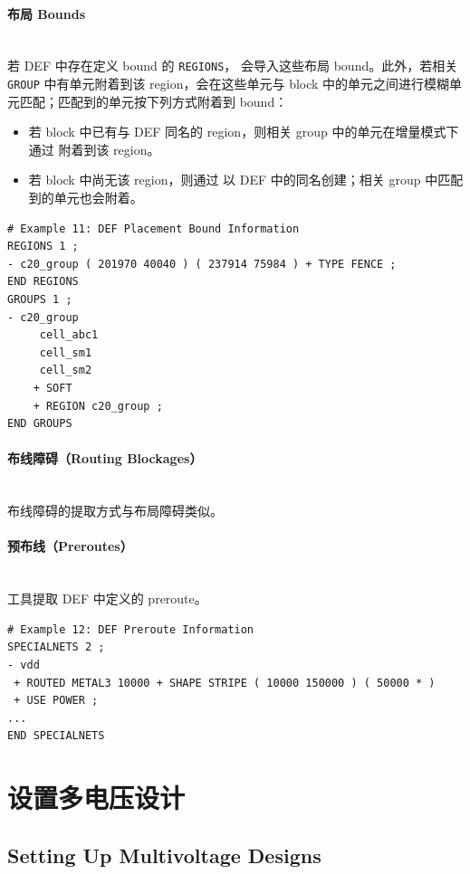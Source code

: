 \paragraph{布局 Bounds}\mbox{}\\
若 DEF 中存在定义 bound 的 \texttt{REGIONS}， 会导入这些布局 bound。此外，若相关 \texttt{GROUP} 中有单元附着到该 region，会在这些单元与 block 中的单元之间进行模糊单元匹配；匹配到的单元按下列方式附着到 bound：
\begin{itemize}
  \item 若 block 中已有与 DEF 同名的 region，则相关 group 中的单元在增量模式下通过  附着到该 region。
  \item 若 block 中尚无该 region，则通过  以 DEF 中的同名创建；相关 group 中匹配到的单元也会附着。
\end{itemize}

\begin{lstlisting}
# Example 11: DEF Placement Bound Information
REGIONS 1 ;
- c20_group ( 201970 40040 ) ( 237914 75984 ) + TYPE FENCE ;
END REGIONS
GROUPS 1 ;
- c20_group
     cell_abc1
     cell_sm1
     cell_sm2
    + SOFT
    + REGION c20_group ;
END GROUPS
\end{lstlisting}

\paragraph{布线障碍（Routing Blockages）}\mbox{}\\
布线障碍的提取方式与布局障碍类似。

\paragraph{预布线（Preroutes）}\mbox{}\\
工具提取 DEF 中定义的 preroute。

\begin{lstlisting}
# Example 12: DEF Preroute Information
SPECIALNETS 2 ;
- vdd
 + ROUTED METAL3 10000 + SHAPE STRIPE ( 10000 150000 ) ( 50000 * )
 + USE POWER ;
...
END SPECIALNETS
\end{lstlisting}

\section{设置多电压设计}
\subsection*{Setting Up Multivoltage Designs}

